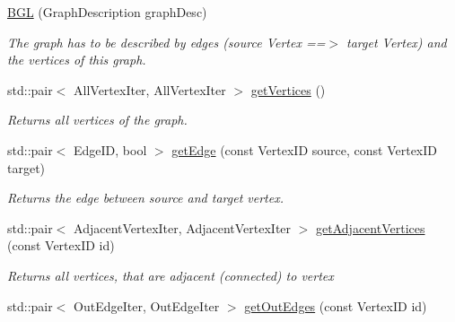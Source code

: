 \begin{DoxyCompactItemize}
\item 
\hypertarget{classgraybat_1_1graphPolicy_1_1BGL_ae062d8b00efe814ec10ecb9caeea6d48}{}\hyperlink{classgraybat_1_1graphPolicy_1_1BGL_ae062d8b00efe814ec10ecb9caeea6d48}{B\+G\+L} (Graph\+Description graph\+Desc)\label{classgraybat_1_1graphPolicy_1_1BGL_ae062d8b00efe814ec10ecb9caeea6d48}

\begin{DoxyCompactList}\small\item\em The graph has to be described by {\itshape edges} (source Vertex ==$>$ target Vertex) and the {\itshape vertices} of this graph. \end{DoxyCompactList}\item 
\hypertarget{classgraybat_1_1graphPolicy_1_1BGL_ade448ae25290e434463d31a27c1387db}{}std\+::pair$<$ All\+Vertex\+Iter, All\+Vertex\+Iter $>$ \hyperlink{classgraybat_1_1graphPolicy_1_1BGL_ade448ae25290e434463d31a27c1387db}{get\+Vertices} ()\label{classgraybat_1_1graphPolicy_1_1BGL_ade448ae25290e434463d31a27c1387db}

\begin{DoxyCompactList}\small\item\em Returns all vertices of the graph. \end{DoxyCompactList}\item 
\hypertarget{classgraybat_1_1graphPolicy_1_1BGL_ad23dcf17164f42ec8fb9fe7a3de8c01e}{}std\+::pair$<$ Edge\+I\+D, bool $>$ \hyperlink{classgraybat_1_1graphPolicy_1_1BGL_ad23dcf17164f42ec8fb9fe7a3de8c01e}{get\+Edge} (const Vertex\+I\+D source, const Vertex\+I\+D target)\label{classgraybat_1_1graphPolicy_1_1BGL_ad23dcf17164f42ec8fb9fe7a3de8c01e}

\begin{DoxyCompactList}\small\item\em Returns the edge between source and target vertex. \end{DoxyCompactList}\item 
\hypertarget{classgraybat_1_1graphPolicy_1_1BGL_a1f01ae55ce810b789df9f64806c94bec}{}std\+::pair$<$ Adjacent\+Vertex\+Iter, Adjacent\+Vertex\+Iter $>$ \hyperlink{classgraybat_1_1graphPolicy_1_1BGL_a1f01ae55ce810b789df9f64806c94bec}{get\+Adjacent\+Vertices} (const Vertex\+I\+D id)\label{classgraybat_1_1graphPolicy_1_1BGL_a1f01ae55ce810b789df9f64806c94bec}

\begin{DoxyCompactList}\small\item\em Returns all vertices, that are adjacent (connected) to {\itshape vertex} \end{DoxyCompactList}\item 
\hypertarget{classgraybat_1_1graphPolicy_1_1BGL_a57d05597e0b6ed9f92828809cb6740f5}{}std\+::pair$<$ Out\+Edge\+Iter, Out\+Edge\+Iter $>$ \hyperlink{classgraybat_1_1graphPolicy_1_1BGL_a57d05597e0b6ed9f92828809cb6740f5}{get\+Out\+Edges} (const Vertex\+I\+D id)\label{classgraybat_1_1graphPolicy_1_1BGL_a57d05597e0b6ed9f92828809cb6740f5}


\end{DoxyCompactItemize}
